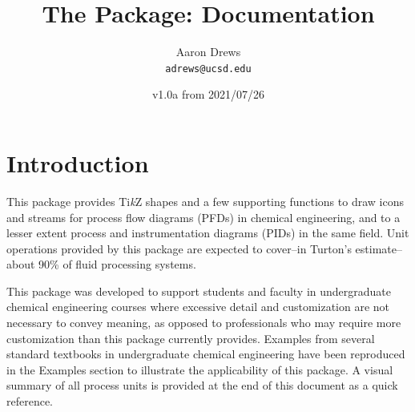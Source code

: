 \documentclass[11pt]{article}
\title{The \boldtt{pfdicons} Package: Documentation}
\author{\Large Aaron Drews\\ \texttt{adrews@ucsd.edu}}
\date{v1.0a from 2021/07/26}
\newcommand\Tikz{Ti\textit{k}Z\xspace}
\begin{document}
\maketitle

\tableofcontents

	
\section{Introduction}
This package provides \Tikz shapes and a few supporting functions to draw icons and streams for process flow diagrams (PFDs) in chemical engineering, and to a lesser extent process and instrumentation diagrams (PIDs) in the same field. Unit operations provided by this package are expected to cover--in Turton's estimate--about 90\% of fluid processing systems. 

This package was developed to support students and faculty in undergraduate chemical engineering courses where excessive detail and customization are not necessary to convey meaning, as opposed to professionals who may require more customization than this package currently provides. Examples from several standard textbooks in undergraduate chemical engineering have been reproduced in the Examples section to illustrate the applicability of this package. A visual summary of all process units is provided at the end of this document as a quick reference.
\end{document}
